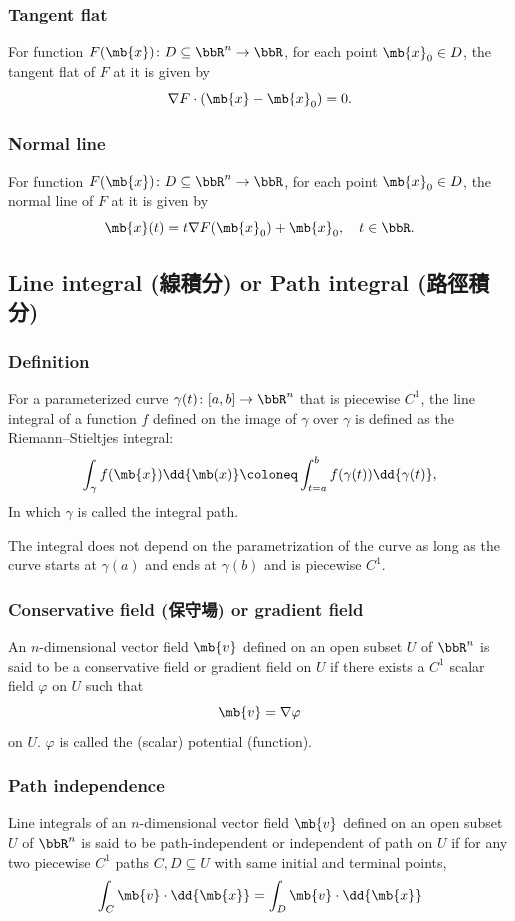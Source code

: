 \documentclass[a4paper,12pt]{report}
\begin{document}
\begin{itemize}
\begin{itemize}
\subsubsection{Tangent flat}
For function $F(\mb{x})\colon D\subseteq\bbR^n\to\bbR$, for each point $\mb{x}_0\in D$, the tangent flat of $F$ at it is given by
\[\nabla F\cdot(\mb{x}-\mb{x}_0)=0.\]
\subsubsection{Normal line}
For function $F(\mb{x})\colon D\subseteq\bbR^n\to\bbR$, for each point $\mb{x}_0\in D$, the normal line of $F$ at it is given by
\[\mb{x}(t)=t\nabla F(\mb{x}_0)+\mb{x}_0,\quad t\in\bbR.\]
\subsection{Line integral (線積分) or Path integral (路徑積分)}
\subsubsection{Definition}
For a parameterized curve $\gamma(t)\colon[a,b]\to\bbR^n$ that is piecewise $C^1$, the line integral of a function $f$ defined on the image of $\gamma$ over $\gamma$ is defined as the Riemann–Stieltjes integral:
\[\int_{\gamma}f(\mb{x})\dd{\mb(x)}\coloneq\int_{t=a}^bf(\gamma(t))\dd{\gamma(t)},\]
In which $\gamma$ is called the integral path.

The integral does not depend on the parametrization of the curve as long as the curve starts at $\gamma(a)$ and ends at $\gamma(b)$ and is piecewise $C^1$.
\subsubsection{Conservative field (保守場) or gradient field}
An $n$-dimensional vector field $\mb{v}$ defined on an open subset $U$ of $\bbR^n$ is said to be a conservative field or gradient field on $U$ if there exists a $C^1$ scalar field $\varphi$ on $U$ such that
\[\mb{v}=\nabla\varphi\]
on $U$. $\varphi$ is called the (scalar) potential (function).
\subsubsection{Path independence}
Line integrals of an $n$-dimensional vector field $\mb{v}$ defined on an open subset $U$ of $\bbR^n$ is said to be path-independent or independent of path on $U$ if for any two piecewise $C^1$ paths $C,D\subseteq U$ with same initial and terminal points,
\[\int_C\mb{v}\cdot\dd{\mb{x}}=\int_D\mb{v}\cdot\dd{\mb{x}}\]

\end{itemize}
\end{itemize}
\end{document}
